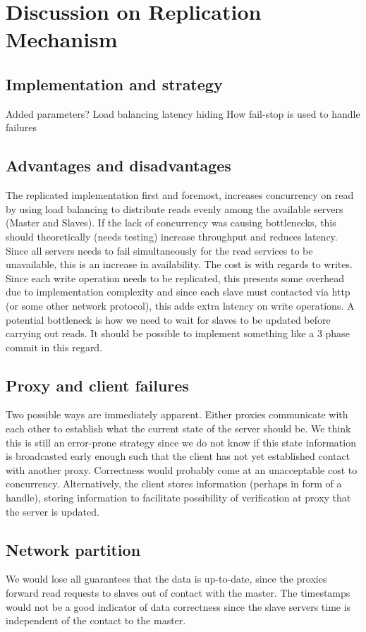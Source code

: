 
\section{Discussion on Replication Mechanism}

\subsection{Implementation and strategy}

Added parameters?
Load balancing
latency hiding
How fail-stop is used to handle failures

\subsection{Advantages and disadvantages}
The replicated implementation first and foremost, increases concurrency on
read by using load balancing to distribute reads evenly among the available
servers (Master and Slaves). If the lack of concurrency was causing
bottlenecks, this should theoretically (needs testing) increase throughput and
reduces latency. Since all servers needs to fail simultaneously for the read
services to be unavailable, this is an increase in availability. The cost is
with regards to writes. Since each write operation needs to be replicated,
this presents some overhead due to implementation complexity and since each
slave must contacted via http (or some other network protocol), this adds
extra latency on write operations. A potential bottleneck is how we need to
wait for slaves to be updated before carrying out reads. It should be possible
to implement something like a 3 phase commit in this regard.

\subsection{Proxy and client failures}
Two possible ways are immediately apparent. Either proxies communicate with
each other to establish what the current state of the server should be. We
think this is still an error-prone strategy since we do not know if this state
information is broadcasted early enough such that the client has not yet
established contact with another proxy. Correctness would probably come at an
unacceptable cost to concurrency. Alternatively, the client stores information
(perhaps in form of a handle), storing information to facilitate possibility
of verification at proxy that the server is updated.

\subsection{Network partition}
We would lose all guarantees that the data is up-to-date, since the proxies
forward read requests to slaves out of contact with the master. The timestamps
would not be a good indicator of data correctness since the slave servers time
is independent of the contact to the master.
